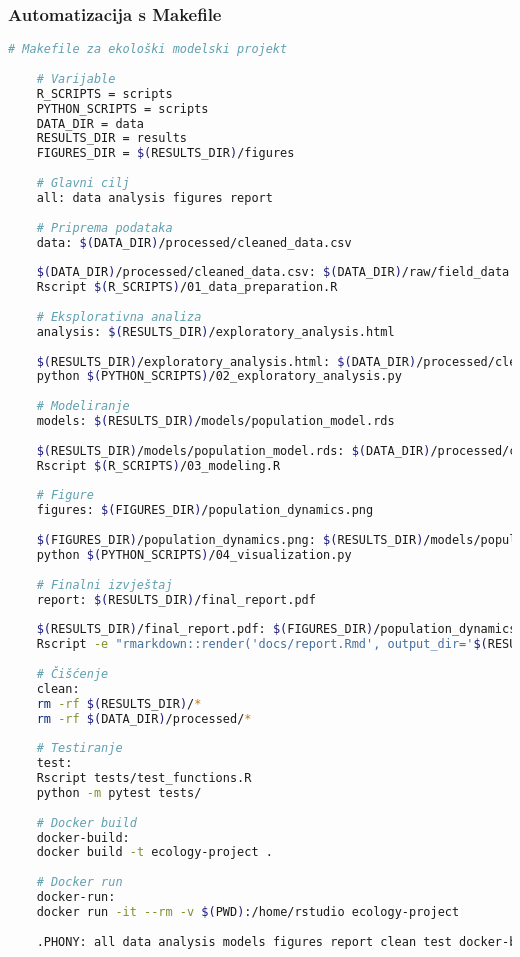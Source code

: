 \documentclass[11pt,oneside]{book}
\begin{document}
\subsubsection{Automatizacija s Makefile}

\begin{lstlisting}[language=bash, caption=Makefile za automatizaciju analize]
	# Makefile za ekološki modelski projekt
	
	# Varijable
	R_SCRIPTS = scripts
	PYTHON_SCRIPTS = scripts
	DATA_DIR = data
	RESULTS_DIR = results
	FIGURES_DIR = $(RESULTS_DIR)/figures
	
	# Glavni cilj
	all: data analysis figures report
	
	# Priprema podataka
	data: $(DATA_DIR)/processed/cleaned_data.csv
	
	$(DATA_DIR)/processed/cleaned_data.csv: $(DATA_DIR)/raw/field_data.csv
	Rscript $(R_SCRIPTS)/01_data_preparation.R
	
	# Eksplorativna analiza
	analysis: $(RESULTS_DIR)/exploratory_analysis.html
	
	$(RESULTS_DIR)/exploratory_analysis.html: $(DATA_DIR)/processed/cleaned_data.csv
	python $(PYTHON_SCRIPTS)/02_exploratory_analysis.py
	
	# Modeliranje
	models: $(RESULTS_DIR)/models/population_model.rds
	
	$(RESULTS_DIR)/models/population_model.rds: $(DATA_DIR)/processed/cleaned_data.csv
	Rscript $(R_SCRIPTS)/03_modeling.R
	
	# Figure
	figures: $(FIGURES_DIR)/population_dynamics.png
	
	$(FIGURES_DIR)/population_dynamics.png: $(RESULTS_DIR)/models/population_model.rds
	python $(PYTHON_SCRIPTS)/04_visualization.py
	
	# Finalni izvještaj
	report: $(RESULTS_DIR)/final_report.pdf
	
	$(RESULTS_DIR)/final_report.pdf: $(FIGURES_DIR)/population_dynamics.png
	Rscript -e "rmarkdown::render('docs/report.Rmd', output_dir='$(RESULTS_DIR)')"
	
	# Čišćenje
	clean:
	rm -rf $(RESULTS_DIR)/*
	rm -rf $(DATA_DIR)/processed/*
	
	# Testiranje
	test:
	Rscript tests/test_functions.R
	python -m pytest tests/
	
	# Docker build
	docker-build:
	docker build -t ecology-project .
	
	# Docker run
	docker-run:
	docker run -it --rm -v $(PWD):/home/rstudio ecology-project
	
	.PHONY: all data analysis models figures report clean test docker-build docker-run
\end{lstlisting}
\end{document}
